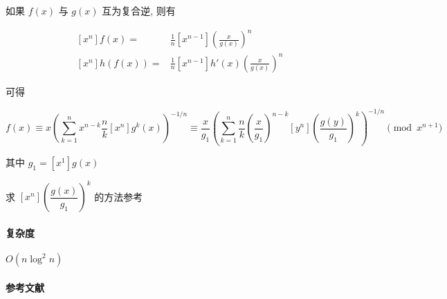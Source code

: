 如果 \(f(x)\) 与 \(g(x)\) 互为复合逆, 则有

\[
    \begin{aligned}
        \left[x^n\right]f(x)=    & \frac{1}{n}\left[x^{n-1}\right]\left(\frac{x}{g(x)}\right)^n      \\
        \left[x^n\right]h(f(x))= & \frac{1}{n}\left[x^{n-1}\right]h'(x)\left(\frac{x}{g(x)}\right)^n
    \end{aligned}
\]

可得

\[
    f(x)\equiv x\left(\sum_{k=1}^nx^{n-k}\frac{n}{k}\left[x^n\right]g^k(x)\right)^{-1/n}\equiv \frac{x}{g_1}\left(\sum_{k=1}^n\frac{n}{k}\left(\frac{x}{g_1}\right)^{n-k}\left[y^n\right]\left(\frac{g(y)}{g_1}\right)^k\right)^{-1/n}\pmod{x^{n + 1}}
\]

其中 \(g_1=\left[x^1\right]g(x)\)

求 \(\left[x^n\right]\left(\dfrac{g(x)}{g_1}\right)^k\) 的方法参考 

\paragraph{复杂度} \(O(n\log^2 n)\)

\paragraph{参考文献} \cite{kinoshita2024power} \cite{antileafstandard}
